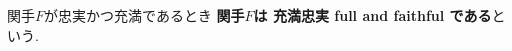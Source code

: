 \begin{Def}
関手$F$が忠実かつ充満であるとき
{\bf 関手$F$は
充満忠実 full and faithful
である}という.
\end{Def}
\begin{comment}
\begin{Def}
圏$\mathscr{A}$が圏$\mathscr{A}$の部分圏であり, 関手$F:\mathscr{A}\rightarrow\mathscr{B}$が充満であるとき,
{\bf 圏$\mathscr{A}$は圏 $\mathscr{B}$の充満部分圏である}という.
\end{Def}
\end{comment}
\begin{comment}
\begin{example}
...充満忠実である.
\end{example}
\begin{example}
...忠実だが充満でない
\end{example}
\begin{example}
充満だが忠実でない
\end{example}
\begin{example}
複素数...

...

...忠実だが充満でない. （例1.30)
\end{example}
\end{comment}
\begin{comment}
\subsection{埋め込み関手}
\subsection{忘却関手}
\end{comment}

